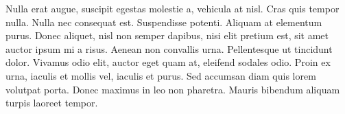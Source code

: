 \documentclass[../main.tex]{subfiles}
\begin{document}
Nulla erat augue, suscipit egestas molestie a, vehicula at nisl. Cras quis tempor nulla. Nulla nec consequat est. Suspendisse potenti. Aliquam at elementum purus. Donec aliquet, nisl non semper dapibus, nisi elit pretium est, sit amet auctor ipsum mi a risus. Aenean non convallis urna. Pellentesque ut tincidunt dolor. Vivamus odio elit, auctor eget quam at, eleifend sodales odio. Proin ex urna, iaculis et mollis vel, iaculis et purus. Sed accumsan diam quis lorem volutpat porta. Donec maximus in leo non pharetra. Mauris bibendum aliquam turpis laoreet tempor.
\end{document}
